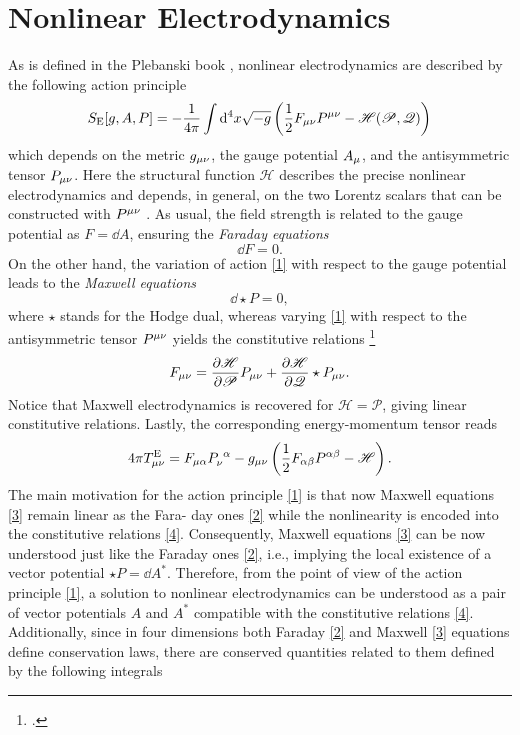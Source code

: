 \section{Nonlinear Electrodynamics}
As is defined in the Plebanski book \cite{Plebanski:1970zz}, nonlinear electrodynamics are described by the following action principle
\begin{equation}\label{1}
  S_{\rm E}[g,A,P]=-\frac{1}{4\pi }\int\dd^4 x\sqrt{-g}\left(\frac{1}{2}F_{\mu\nu }P^{\mu\nu }-\mathscr{H}(\mathscr{P},\mathscr{Q})\right)
\end{equation}
which depends on the metric $g_{\mu\nu }$, the gauge potential $A_\mu$, and the antisymmetric tensor $P_{\mu\nu }$. Here the structural function $\mathscr{H}$ describes the precise nonlinear electrodynamics and depends, in general, on the two Lorentz scalars that can be constructed with $P^{\mu\nu }$ \cite{Born:1934gh}. As usual, the field strength is related to the gauge potential as $F=\dd A$, ensuring the \textit{Faraday equations}
\begin{equation}\label{2}
  \dd F=0.
\end{equation}
On the other hand, the variation of action \eqref{1} with respect to the gauge potential leads to the \textit{Maxwell equations}
\begin{equation}\label{3}
	\dd \star P=0, 
\end{equation}
where $\star$ stands for the Hodge dual, whereas varying \eqref{1} with respect to the antisymmetric tensor $P^{\mu\nu }$ yields the constitutive relations \footnote{.}
\begin{equation}\label{4}
  F_{\mu\nu }=\pdv{\mathscr{H}}{\mathscr{P}}P_{\mu\nu }+\pdv{\mathscr{H}}{\mathscr{Q}}\star P_{\mu\nu }.
\end{equation}
Notice that Maxwell electrodynamics is recovered for $\mathscr{H}=\mathscr{P}$, giving linear constitutive relations. Lastly, the corresponding energy-momentum tensor reads
\begin{equation}\label{5}
  4\pi T_{\mu\nu }^{\rm E}=F_{\mu\alpha }P_{\nu }^{~\alpha }-g_{\mu\nu }\left(\frac{1}{2}F_{\alpha\beta }P^{\alpha\beta }-\mathscr{H}\right). 
\end{equation}
The main motivation for the action principle \eqref{1} is that now Maxwell equations \eqref{3} remain linear as the Fara- day ones \eqref{2} while the nonlinearity is encoded into the constitutive relations \eqref{4}. Consequently, Maxwell equations \eqref{3} can be now understood just like the Faraday ones \eqref{2}, i.e., implying the local existence of a vector potential $\star P=\dd A^*$. Therefore, from the point of view of the action principle \eqref{1}, a solution to nonlinear electrodynamics can be understood as a pair of vector potentials $A$ and $A^*$ compatible with the constitutive relations \eqref{4}. Additionally, since in four dimensions both Faraday \eqref{2} and Maxwell \eqref{3} equations define conservation laws, there are conserved quantities related to them defined by the following integrals
